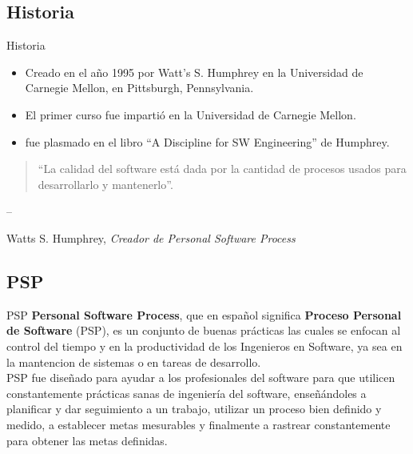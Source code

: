 \documentclass{beamer}
\begin{document}
		\subsection{Historia}
			\begin{frame}{Historia}
				\pause
				\begin{itemize}
					\item Creado en el año 1995 por Watt's S. Humphrey en la Universidad de Carnegie Mellon, en Pittsburgh, Pennsylvania.\\ \pause
					\item El primer curso fue imparti\'o en la Universidad de Carnegie Mellon.\\ \pause
					\item fue plasmado en el libro ``A Discipline for SW Engineering'' de Humphrey.\\
				\end{itemize}
			\end{frame}
		
				\begin{frame}
					\begin{quotation}``La calidad del software está dada por la cantidad de procesos usados para desarrollarlo y mantenerlo''.\end{quotation}
			
				\hfill -- \parbox[t]{.9\textwidth}{Watts S. Humphrey,
				\textit{Creador de Personal Software Process}}

				\end{frame}
		
		\subsection{PSP}
			\begin{frame}{PSP}
				\textbf{Personal Software Process}, que en español significa \textbf{Proceso Personal de Software} (PSP), es un conjunto de buenas pr\'acticas las cuales se enfocan al control del tiempo y en la productividad de los Ingenieros en Software, ya sea en la mantencion de sistemas o en tareas de desarrollo.
				\\ \smallskip
				PSP fue diseñado para ayudar a los profesionales del software para que utilicen constantemente prácticas sanas de ingeniería del software, enseñándoles a planificar y dar seguimiento a un trabajo, utilizar un proceso bien definido y medido, a establecer metas mesurables y finalmente a rastrear constantemente para obtener las metas definidas.
			\end{frame}
			
\end{document}
